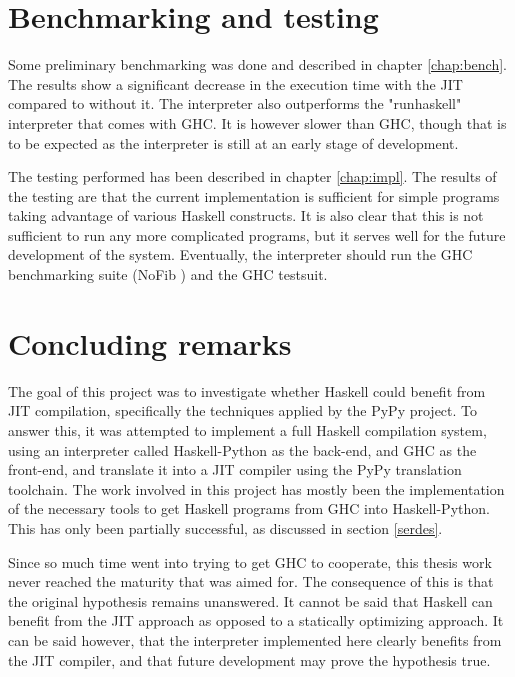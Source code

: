 \section{Benchmarking and testing}

Some preliminary benchmarking was done and described in chapter \ref{chap:bench}. 
The results
show a significant decrease in the execution time with the JIT compared to without it.
The interpreter also outperforms the "runhaskell" interpreter that comes with GHC. It
is however slower than GHC, though that is to be expected as the interpreter is still 
at an early stage of development.

The testing performed has been described in chapter \ref{chap:impl}. The results of the 
testing are that the current implementation is sufficient for simple programs taking 
advantage of various Haskell constructs. It is also clear that this is not sufficient
to run any more complicated programs, but it serves well for the future development of
the system. Eventually, the interpreter should run the GHC benchmarking suite 
(NoFib \cite{partain1992nofib}) and the GHC testsuit.

\section{Concluding remarks}


The goal of this project was to investigate whether Haskell could benefit from JIT 
compilation, specifically the techniques applied by the PyPy project. 
To answer this, it was attempted to implement a full Haskell compilation
system, using an interpreter called Haskell-Python\cite{haskellpython} as the back-end,
and GHC as the front-end, and translate it into a JIT compiler using the PyPy translation
toolchain. The work involved in this project has mostly been the implementation of the necessary
tools to get Haskell programs from GHC into Haskell-Python. This has only been partially
successful, as discussed in section \ref{serdes}. 

Since so much time went into trying to get GHC to cooperate, this thesis work never reached the
maturity that was aimed for. The consequence of this is that the original hypothesis remains
unanswered. It cannot be said that Haskell can benefit from the JIT approach as opposed to a
statically optimizing approach. It can be said however, that the interpreter implemented here 
clearly benefits from the JIT compiler, and that future development may prove the hypothesis true.

